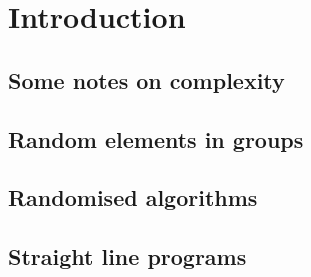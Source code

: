 
\chapter{Introduction}


\section{Some notes on complexity}
\label{sec:complexity}

\section{Random elements in groups}
\label{randomelts}

\section{Randomised algorithms}
\label{montevegas}

\section{Straight line programs}
\label{slp}
